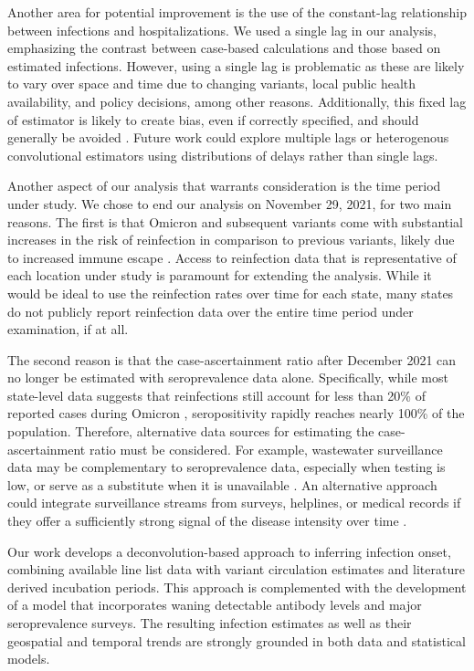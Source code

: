 Another area for potential 
improvement is the use of the constant-lag relationship between infections and
hospitalizations. We used
a single lag in our analysis, emphasizing the contrast between case-based
calculations and those based on estimated infections.
However, using a single lag is problematic as these are likely to vary over space and
time \citep{react12022} due to changing variants, local public health
availability, and policy decisions, among other reasons. Additionally, this
fixed lag
of estimator is likely to create bias, even if correctly specified, and should
generally be avoided \citep{GoldwasserHu2024}. Future work could explore multiple lags or heterogenous
convolutional estimators \citep{Overton2022} using distributions of delays rather than single lags.


Another aspect of our analysis that warrants consideration is the time period under study. 
We chose to end our analysis on November 29, 2021, for two main reasons. The
first is that Omicron and subsequent variants come with substantial increases in
the risk of reinfection in comparison to previous variants, likely due to
increased immune escape \citep{wei2024risk, pulliam2022increased,
eythorsson2022rate}. Access to reinfection data that is representative of each
location under study is paramount for extending the analysis. While it would be
ideal to use the reinfection rates over time for each \US state, many states do
not publicly report reinfection data over the entire time period under
examination, if at all.

The second reason is that the case-ascertainment ratio after December 2021 can
no longer be estimated with seroprevalence data alone. Specifically, while most
state-level data suggests that reinfections still account for less than 20\% of
reported cases during Omicron \citep{ruff2022rapid, nyreinfect2021,
hireinfect2022, wareinfect2022}, seropositivity rapidly reaches nearly 100\% of
the population. Therefore, alternative data sources for estimating the
case-ascertainment ratio must be considered. For example, wastewater
surveillance data may be complementary to seroprevalence data, especially when
testing is low, or serve as a substitute when it is unavailable
\citep{mcmanus2023predicting}. 
An alternative approach could integrate surveillance streams from
surveys, helplines, or medical records if they
offer a sufficiently strong signal of the disease intensity over time
\citep{reinhart2021open,ecdc2020strategies}.

Our work develops a deconvolution-based approach to inferring infection onset,
combining available line list data with variant circulation estimates and
literature derived incubation periods.
 This approach is complemented with the development of a model that incorporates
 waning detectable antibody levels and major seroprevalence surveys.
The resulting infection estimates as well as their geospatial and temporal
trends are strongly grounded in both data and statistical models.

